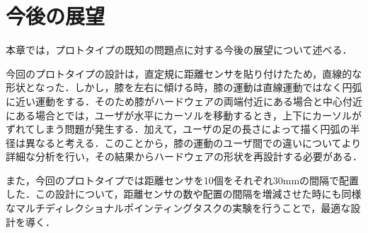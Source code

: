 \chapter{今後の展望}
本章では，プロトタイプの既知の問題点に対する今後の展望について述べる．

今回のプロトタイプの設計は，直定規に距離センサを貼り付けたため，直線的な形状となった．しかし，膝を左右に傾ける時，膝の運動は直線運動ではなく円弧に近い運動をする．そのため膝がハードウェアの両端付近にある場合と中心付近にある場合とでは，ユーザが水平にカーソルを移動するとき，上下にカーソルがずれてしまう問題が発生する．加えて，ユーザの足の長さによって描く円弧の半径は異なると考える．このことから，膝の運動のユーザ間での違いについてより詳細な分析を行い，その結果からハードウェアの形状を再設計する必要がある．


また，今回のプロトタイプでは距離センサを10個をそれぞれ30\si{mm}の間隔で配置した．この設計について，距離センサの数や配置の間隔を増減させた時にも同様なマルチディレクショナルポインティングタスクの実験を行うことで，最適な設計を導く．